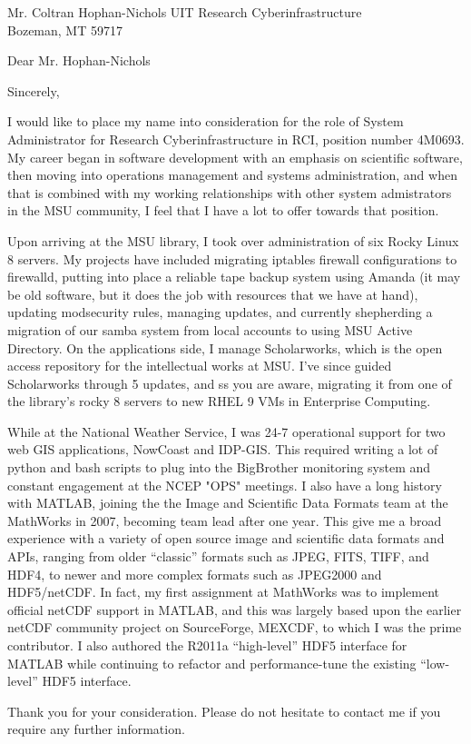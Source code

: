 \documentclass[11pt]{moderncv}  %
\begin{document}
\recipient
{Mr. Coltran Hophan-Nichols}
{UIT Research Cyberinfrastructure\\Bozeman, MT 59717}
\opening{Dear Mr. Hophan-Nichols}
\closing{Sincerely,}


\makelettertitle

I would like to place my name into consideration for the role of
System Administrator for Research Cyberinfrastructure in RCI, 
position number 4M0693.  My career began in software development with an
emphasis on scientific software, then moving into operations
management and systems administration, and when that is combined
with my  working relationships with other system admistrators in
the MSU community, I feel that I have a lot to offer towards that
position.

Upon arriving at the MSU library, I took over administration of six
Rocky Linux 8 servers.  My projects have included migrating 
iptables firewall configurations to firewalld, putting
into place a reliable tape backup system using Amanda (it may be
old software, but it does the job with resources that we have at hand), updating modsecurity rules, 
managing updates,
and currently shepherding a migration of our samba system from local
accounts
to using MSU Active Directory.  On the applications
side, I manage Scholarworks, which is the open access repository
for the intellectual works at MSU.  I've since guided Scholarworks through
5 updates, and ss you are aware, migrating
it from one of the library's rocky 8 servers to new RHEL 9 VMs in
Enterprise Computing.

While at the National Weather Service, I was 24-7 operational support for two web GIS applications, NowCoast and IDP-GIS.  This required writing a lot of python
and bash scripts to plug into the BigBrother monitoring system and constant engagement at the NCEP "OPS" meetings.  I also have
a long history with MATLAB, joining the the Image and
Scientific Data Formats team at the MathWorks in 2007, becoming  team lead
after one year.  This give me a broad experience with a variety of
open source image and scientific data formats and APIs, ranging
from older “classic” formats such as JPEG, FITS, TIFF, and HDF4,
to newer and more complex formats such as JPEG2000 and HDF5/netCDF.
In fact, my first assignment at MathWorks was to implement official
netCDF support in MATLAB, and this was largely based upon the earlier
netCDF community project on SourceForge, MEXCDF, to which I was the
prime contributor.   I also authored the R2011a “high-level” HDF5
interface for MATLAB while continuing to refactor and performance-tune
the existing “low-level” HDF5 interface.

Thank you for your consideration.  Please do not hesitate to contact
me if you require any further information.

\makeletterclosing
\end{document}
